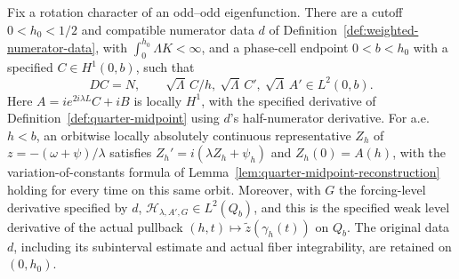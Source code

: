 \begin{lemma}
\label{lem:dd-log-midpoint}
\leanok
Fix a rotation character of an odd--odd eigenfunction.
There are a cutoff $0<h_0<1/2$ and compatible numerator data $d$
of Definition~\ref{def:weighted-numerator-data}, with
$\int_0^{h_0}\Lambda K<\infty$, and a phase-cell endpoint $0<b<h_0$
with a specified $C\in H^1(0,b)$, such that
\[
 DC=N,\qquad
 \sqrt\Lambda\,C/h,\ \sqrt\Lambda\,C',\ \sqrt\Lambda\,A'\in L^2(0,b).
\]
Here $A=i e^{2i\lambda L}C+iB$ is locally $H^1$, with the specified
derivative of Definition~\ref{def:quarter-midpoint} using $d$'s half-numerator
derivative. For a.e.\ $h<b$, an orbitwise locally absolutely continuous
representative $Z_h$ of $z=-(\omega+\psi)/\lambda$ satisfies
$Z_h'=i(\lambda Z_h+\psi_h)$ and $Z_h(0)=A(h)$, with the
variation-of-constants formula of Lemma~\ref{lem:quarter-midpoint-reconstruction}
holding for every time on this same orbit.
Moreover, with $G$ the forcing-level derivative specified by $d$,
$\mathcal H_{\lambda,A',G}\in L^2(Q_b)$, and this is the specified weak
level derivative of the actual pullback
$(h,t)\mapsto\widetilde z(\gamma_h(t))$ on $Q_b$.
The original data $d$, including its subinterval estimate and actual
fiber integrability, are retained on $(0,h_0)$.
\end{lemma}

